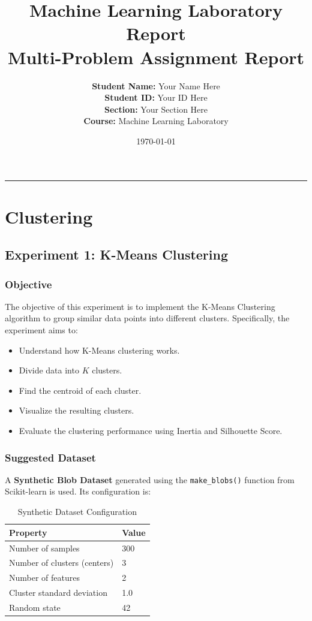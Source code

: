\documentclass[a4paper,11pt]{article}
\title{\textbf{Machine Learning Laboratory Report}\\
\Large Multi-Problem Assignment Report}
\author{
    \textbf{Student Name:} Your Name Here \\
    \textbf{Student ID:} Your ID Here \\
    \textbf{Section:} Your Section Here \\
    \textbf{Course:} Machine Learning Laboratory
}
\date{\today}
\newcommand{\hr}{\rule{\linewidth}{0.5pt}}
\begin{document}
\maketitle
\hr

\tableofcontents
\newpage

\section{Clustering}

\subsection{Experiment 1: K-Means Clustering}

\subsubsection{Objective}
The objective of this experiment is to implement the K-Means Clustering algorithm to group similar data points into different clusters. Specifically, the experiment aims to:
\begin{itemize}
    \item Understand how K-Means clustering works.
    \item Divide data into $K$ clusters.
    \item Find the centroid of each cluster.
    \item Visualize the resulting clusters.
    \item Evaluate the clustering performance using Inertia and Silhouette Score.
\end{itemize}

\subsubsection{Suggested Dataset}
A \textbf{Synthetic Blob Dataset} generated using the \texttt{make\_blobs()} function from Scikit-learn is used. Its configuration is:

\begin{table}[H]
\centering
\caption{Synthetic Dataset Configuration}
\begin{tabular}{ll}
\toprule
\textbf{Property} & \textbf{Value} \\
\midrule
Number of samples           & 300 \\
Number of clusters (centers) & 3 \\
Number of features          & 2 \\
Cluster standard deviation  & 1.0 \\
Random state                & 42 \\
\bottomrule
\end{tabular}
\end{table}
\end{document}
